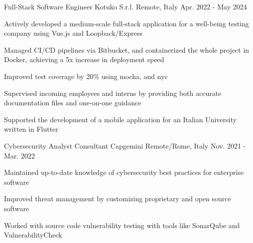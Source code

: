 \begin{cventries}
	\cventry
	{Full-Stack Software Engineer} %
	{Kotuko S.r.l.} %
	{Remote, Italy} %
	{Apr. 2022 - May 2024} %
	{
		\begin{cvitems} %
			\item {Actively developed a medium-scale full-stack application for a well-being testing company using Vue.js and Loopback/Express}
			\item {Managed CI/CD pipelines via Bitbucket, and containerized the whole project in Docker, achieving a 5x increase in deployment speed}
			\item {Improved test coverage by 20\% using mocha, and nyc}
			\item {Supervised incoming employees and interns by providing both accurate documentation files and one-on-one guidance}
			\item {Supported the development of a mobile application for an Italian University written in Flutter}
		\end{cvitems}
	}

	\cventry
	{Cybersecurity Analyst Consultant} %
	{Capgemini} %
	{Remote/Rome, Italy} %
	{Nov. 2021 - Mar. 2022} %
	{
		\begin{cvitems} %
			\item {Maintained up-to-date knowledge of cybersecurity best practices for enterprise software}
			\item {Improved threat management by customizing proprietary and open source software}
			\item {Worked with source code vulnerability testing with tools like SonarQube and VulnerabilityCheck}
		\end{cvitems}
	}
\end{cventries}
